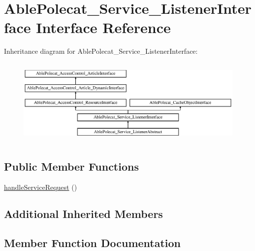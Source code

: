 \hypertarget{interface_able_polecat___service___listener_interface}{}\section{Able\+Polecat\+\_\+\+Service\+\_\+\+Listener\+Interface Interface Reference}
\label{interface_able_polecat___service___listener_interface}
Inheritance diagram for Able\+Polecat\+\_\+\+Service\+\_\+\+Listener\+Interface\+:\begin{figure}[H]
\begin{center}
\leavevmode
\includegraphics[height=4.268293cm]{interface_able_polecat___service___listener_interface}
\end{center}
\end{figure}
\subsection*{Public Member Functions}
\begin{DoxyCompactItemize}
\item 
\hyperlink{interface_able_polecat___service___listener_interface_ac060d9e99b6fe870b0351a15276a0229}{handle\+Service\+Request} ()
\end{DoxyCompactItemize}
\subsection*{Additional Inherited Members}


\subsection{Member Function Documentation}
\hypertarget{interface_able_polecat___service___listener_interface_ac060d9e99b6fe870b0351a15276a0229}{}
